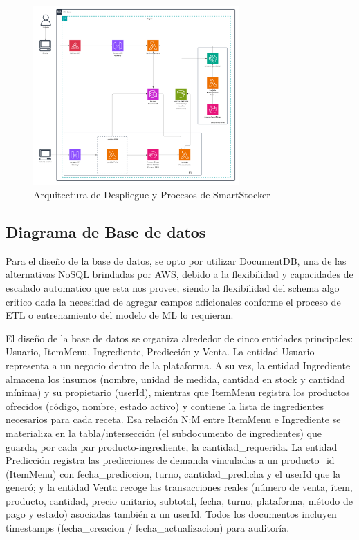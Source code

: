 \begin{figure}[htbp]
    \centering
    \includegraphics[width=0.7\textwidth]{images/arquitectura_despliegue.png}
    \caption{Arquitectura de Despliegue y Procesos de SmartStocker}
    \label{fig:arquitectura-despliegue}
\end{figure}

\subsection{Diagrama de Base de datos}\label{sec:arquitectura-base-datos}

Para el diseño de la base de datos, se opto por utilizar DocumentDB, una de las alternativas NoSQL brindadas por AWS, debido a la flexibilidad y capacidades de escalado automatico que esta nos provee, siendo la flexibilidad del schema algo critico dada la necesidad de agregar campos adicionales conforme el proceso de ETL o entrenamiento del modelo de ML lo requieran.

El diseño de la base de datos se organiza alrededor de cinco entidades principales: Usuario, ItemMenu, Ingrediente, Predicción y Venta. La entidad Usuario representa a un negocio dentro de la plataforma. A su vez, la entidad Ingrediente almacena los insumos (nombre, unidad de medida, cantidad en stock y cantidad mínima) y su propietario (userId), mientras que ItemMenu registra los productos ofrecidos (código, nombre, estado activo) y contiene la lista de ingredientes necesarios para cada receta. Esa relación N:M entre ItemMenu e Ingrediente se materializa en la tabla/intersección (el subdocumento de ingredientes) que guarda, por cada par producto-ingrediente, la cantidad\_requerida. La entidad Predicción registra las predicciones de demanda vinculadas a un producto\_id (ItemMenu) con fecha\_prediccion, turno, cantidad\_predicha y el userId que la generó; y la entidad Venta recoge las transacciones reales (número de venta, ítem, producto, cantidad, precio unitario, subtotal, fecha, turno, plataforma, método de pago y estado) asociadas también a un userId. Todos los documentos incluyen timestamps (fecha\_creacion / fecha\_actualizacion) para auditoría.

